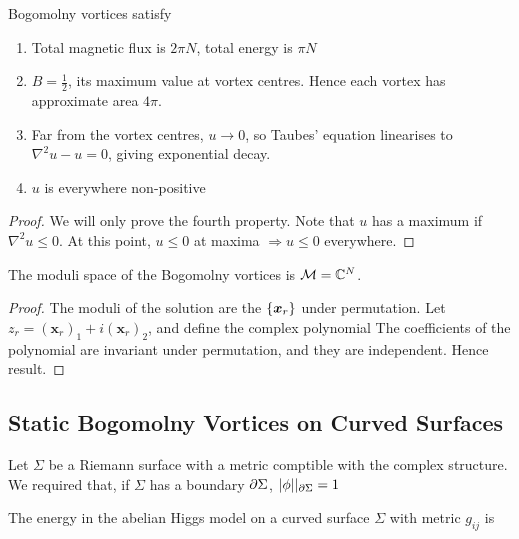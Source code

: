 \documentclass{article}
\begin{document}
\begin{prop}
Bogomolny vortices satisfy 
\begin{enumerate}
    \item Total magnetic flux is $2\pi N$, total energy is $\pi N$
    \item $B=\frac{1}{2}$, its maximum value at vortex centres. Hence each vortex has approximate area $4\pi$. 
    \item Far from the vortex centres, $u \to 0$, so Taubes' equation linearises to $\nabla^2 u - u = 0$, giving exponential decay. 
    \item $u$ is everywhere non-positive
\end{enumerate}
\end{prop}
\begin{proof}
We will only prove the fourth property. Note that $u$ has a maximum if $\nabla^2 u \leq 0$. At this point,
$u \leq 0 $ at maxima $\Rightarrow u \leq 0$ everywhere. 
\end{proof}

\begin{prop}
The moduli space of the Bogomolny vortices is $\mathcal{M} = \mathbb{C}^N$.
\end{prop}
\begin{proof}
The moduli of the solution are the $\left\{ \bm{x}_r \right\}$ under permutation.
Let $z_r = (\bm{x}_r)_1 + i(\bm{x}_r)_2$, and define the complex polynomial 
The coefficients of the polynomial are invariant under permutation, and they are independent. Hence result. 
\end{proof}
\subsection{Static Bogomolny Vortices on Curved Surfaces}
Let $\Sigma$ be a Riemann surface with a metric comptible with the complex structure. We required that, if $\Sigma$ has a boundary $\partial \Sigma$, $\left\lvert \phi \right\rvert\rvert_{\partial\Sigma} = 1$

\begin{definition}
The energy in the abelian Higgs model on a curved surface $\Sigma$ with metric $g_{ij}$ is 
\end{definition}
\end{document}
